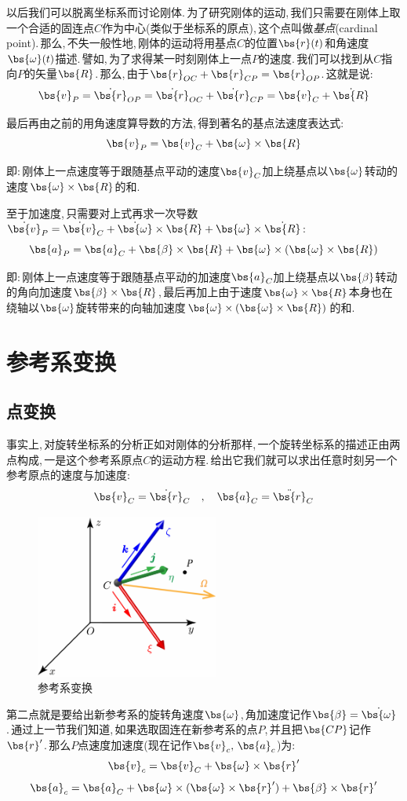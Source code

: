 以后我们可以脱离坐标系而讨论刚体.\,为了研究刚体的运动,\,我们只需要在刚体上取一个合适的固连点$C$作为中心(类似于坐标系的原点),\,这个点叫做\emph{基点}(cardinal point).\,那么,\,不失一般性地,\,刚体的运动将用基点$C$的位置$\bs{r}(t)$和角速度$\bs{\omega}(t)$描述.\,譬如,\,为了求得某一时刻刚体上一点$P$的速度.\,我们可以找到从$C$指向$P$的矢量$\bs{R}$.\,那么,\,由于$\bs{r}_{OC}+\bs{r}_{CP}=\bs{r}_{OP}$.\,这就是说:
\[\bs{v}_{P}=\dot{\bs{r}}_{OP}=\dot{\bs{r}}_{OC}+\dot{\bs{r}}_{CP}=\bs{v}_{C}+\dot{\bs{R}}\]

最后再由之前的用角速度算导数的方法,\,得到著名的基点法速度表达式:
\[\bs{v}_{P}=\bs{v}_{C}+\bs{\omega}\times\bs{R}\]

即:\,刚体上一点速度等于跟随基点平动的速度$\bs{v}_{C}$加上绕基点以$\bs{\omega}$转动的速度$\bs{\omega}\times\bs{R}$的和.

至于加速度,\,只需要对上式再求一次导数$\dot{\bs{v}}_{P}=\dot{\bs{v}}_{C}+\dot{\bs{\omega}}\times\bs{R}+\bs{\omega}\times\dot{\bs{R}}$:
\[\bs{a}_{P}=\bs{a}_{C}+\bs{\beta}\times\bs{R}+\bs{\omega}\times(\bs{\omega}\times\bs{R})\]

即:\,刚体上一点速度等于跟随基点平动的加速度$\bs{a}_{C}$加上绕基点以$\bs{\beta}$转动的角向加速度$\bs{\beta}\times\bs{R}$,\,最后再加上由于速度$\bs{\omega}\times\bs{R}$本身也在绕轴以$\bs{\omega}$旋转带来的向轴加速度$\bs{\omega}\times(\bs{\omega}\times\bs{R})$的和.


\section{参考系变换}

\subsection{点变换}

事实上,\,对旋转坐标系的分析正如对刚体的分析那样,\,一个旋转坐标系的描述正由两点构成,\,一是这个参考系原点$C$的运动方程.\,给出它我们就可以求出任意时刻另一个参考原点的速度与加速度:
\[\bs{v}_C=\dot{\bs{r}}_C\quad,\quad \bs{a}_C=\ddot{\bs{r}}_C\]


\begin{figure}\label{6-1-10}
\vspace{-0.2cm}
\centering
\includegraphics[width=6cm]{image/6-1-10.png}
\caption{参考系变换}
\end{figure}
第二点就是要给出新参考系的旋转角速度$\bs{\omega}$,\,角加速度记作$\bs{\beta}=\dot{\bs{\omega}}$.\,通过上一节我们知道,\,如果选取固连在新参考系的点$P$,\,并且把$\bs{CP}$记作$\bs{r}'$.\,那么$P$点速度加速度(现在记作$\bs{v}_c,\,\bs{a}_c$)为:
\[\bs{v}_c=\bs{v}_C+\bs{\omega}\times \bs{r}'\]
\[\bs{a}_c=\bs{a}_C+\bs{\omega}\times (\bs{\omega}\times\bs{r}')+\bs{\beta}\times\bs{r}'\]

